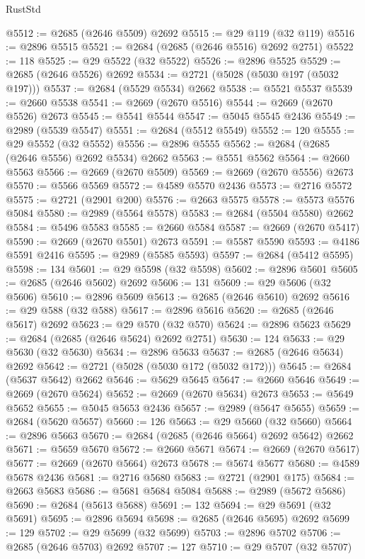 \begin{lexlean}{RustStd}
\begin{coremodule}
@5512 := @2685 (@2646 @5509) @2692
@5515 := @29 @119 (@32 @119)
@5516 := @2896 @5515
@5521 := @2684 (@2685 (@2646 @5516) @2692 @2751)
@5522 := 118
@5525 := @29 @5522 (@32 @5522)
@5526 := @2896 @5525
@5529 := @2685 (@2646 @5526) @2692
@5534 := @2721 (@5028 (@5030 @197 (@5032 @197)))
@5537 := @2684 (@5529 @5534) @2662
@5538 := @5521 @5537
@5539 := @2660 @5538
@5541 := @2669 (@2670 @5516)
@5544 := @2669 (@2670 @5526) @2673
@5545 := @5541 @5544
@5547 := @5045 @5545 @2436
@5549 := @2989 (@5539 @5547)
@5551 := @2684 (@5512 @5549)
@5552 := 120
@5555 := @29 @5552 (@32 @5552)
@5556 := @2896 @5555
@5562 := @2684 (@2685 (@2646 @5556) @2692 @5534) @2662
@5563 := @5551 @5562
@5564 := @2660 @5563
@5566 := @2669 (@2670 @5509)
@5569 := @2669 (@2670 @5556) @2673
@5570 := @5566 @5569
@5572 := @4589 @5570 @2436
@5573 := @2716 @5572
@5575 := @2721 (@2901 @200)
@5576 := @2663 @5575
@5578 := @5573 @5576 @5084
@5580 := @2989 (@5564 @5578)
@5583 := @2684 (@5504 @5580) @2662
@5584 := @5496 @5583
@5585 := @2660 @5584
@5587 := @2669 (@2670 @5417)
@5590 := @2669 (@2670 @5501) @2673
@5591 := @5587 @5590
@5593 := @4186 @5591 @2416
@5595 := @2989 (@5585 @5593)
@5597 := @2684 (@5412 @5595)
@5598 := 134
@5601 := @29 @5598 (@32 @5598)
@5602 := @2896 @5601
@5605 := @2685 (@2646 @5602) @2692
@5606 := 131
@5609 := @29 @5606 (@32 @5606)
@5610 := @2896 @5609
@5613 := @2685 (@2646 @5610) @2692
@5616 := @29 @588 (@32 @588)
@5617 := @2896 @5616
@5620 := @2685 (@2646 @5617) @2692
@5623 := @29 @570 (@32 @570)
@5624 := @2896 @5623
@5629 := @2684 (@2685 (@2646 @5624) @2692 @2751)
@5630 := 124
@5633 := @29 @5630 (@32 @5630)
@5634 := @2896 @5633
@5637 := @2685 (@2646 @5634) @2692
@5642 := @2721 (@5028 (@5030 @172 (@5032 @172)))
@5645 := @2684 (@5637 @5642) @2662
@5646 := @5629 @5645
@5647 := @2660 @5646
@5649 := @2669 (@2670 @5624)
@5652 := @2669 (@2670 @5634) @2673
@5653 := @5649 @5652
@5655 := @5045 @5653 @2436
@5657 := @2989 (@5647 @5655)
@5659 := @2684 (@5620 @5657)
@5660 := 126
@5663 := @29 @5660 (@32 @5660)
@5664 := @2896 @5663
@5670 := @2684 (@2685 (@2646 @5664) @2692 @5642) @2662
@5671 := @5659 @5670
@5672 := @2660 @5671
@5674 := @2669 (@2670 @5617)
@5677 := @2669 (@2670 @5664) @2673
@5678 := @5674 @5677
@5680 := @4589 @5678 @2436
@5681 := @2716 @5680
@5683 := @2721 (@2901 @175)
@5684 := @2663 @5683
@5686 := @5681 @5684 @5084
@5688 := @2989 (@5672 @5686)
@5690 := @2684 (@5613 @5688)
@5691 := 132
@5694 := @29 @5691 (@32 @5691)
@5695 := @2896 @5694
@5698 := @2685 (@2646 @5695) @2692
@5699 := 129
@5702 := @29 @5699 (@32 @5699)
@5703 := @2896 @5702
@5706 := @2685 (@2646 @5703) @2692
@5707 := 127
@5710 := @29 @5707 (@32 @5707)

\end{coremodule}
\end{lexlean}
